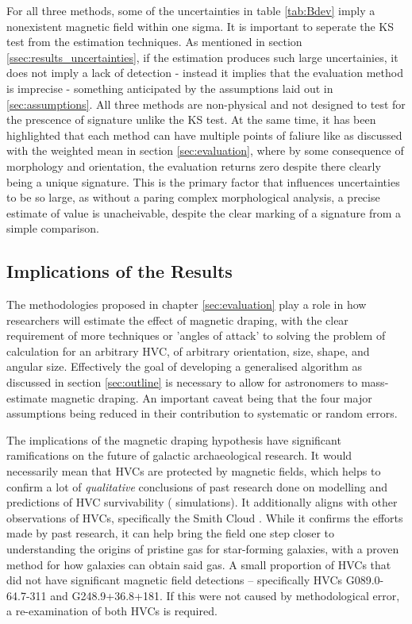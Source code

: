 For all three methods, some of the uncertainties in table \ref{tab:Bdev} imply a nonexistent magnetic field within one sigma. It is important to seperate the KS test from the estimation techniques. As mentioned in section \ref{ssec:results_uncertainties}, if the estimation produces such large uncertainies, it does not imply a lack of detection - instead it implies that the evaluation method is imprecise - something anticipated by the assumptions laid out in \ref{sec:assumptions}. All three methods are non-physical and not designed to test for the prescence of signature unlike the KS test. At the same time, it has been highlighted that each method can have multiple points of faliure like as discussed with the weighted mean in section \ref{sec:evaluation}, where by some consequence of morphology and orientation, the evaluation returns zero despite there clearly being a unique signature. This is the primary factor that influences uncertainties to be so large, as without a paring complex morphological analysis, a precise estimate of value is unacheivable, despite the clear marking of a signature from a simple comparison.

\subsection{Implications of the Results}
\label{ssec:B4}

The methodologies proposed in chapter \ref{sec:evaluation} play a role in how researchers will estimate the effect of magnetic draping, with the clear requirement of more techniques or 'angles of attack' to solving the problem of calculation for an arbitrary HVC, of arbitrary orientation, size, shape, and angular size. Effectively the goal of developing a generalised algorithm as discussed in section \ref{sec:outline} is necessary to allow for astronomers to mass-estimate magnetic draping. An important caveat being that the four major assumptions being reduced in their contribution to systematic or random errors.


The implications of the magnetic draping hypothesis have significant ramifications on the future of galactic archaeological research. It would necessarily mean that HVCs are protected by magnetic fields, which helps to confirm a lot of \textit{qualitative} conclusions of past research done on modelling and predictions of HVC survivability (\citeauthor{ID23} simulations). It additionally aligns with other observations of HVCs, specifically the Smith Cloud \citep{ID5, ID26}. While it confirms the efforts made by past research, it can help bring the field one step closer to understanding the origins of pristine gas for star-forming galaxies, with a proven method for how galaxies can obtain said gas. A small proportion of HVCs that did not have significant magnetic field detections – specifically HVCs G089.0-64.7-311 and G248.9+36.8+181. If this were not caused by methodological error, a re-examination of both HVCs is required.


